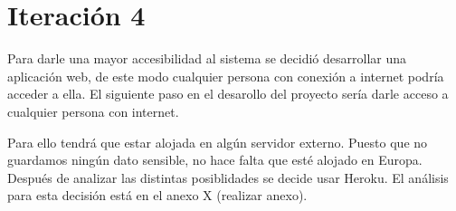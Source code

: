 \section{Iteración 4}

Para darle una mayor accesibilidad al sistema se decidió desarrollar
una aplicación web, de este modo cualquier persona con conexión a
internet podría acceder a ella. El siguiente paso en el desarollo
del proyecto sería darle acceso a cualquier persona con internet.

Para ello tendrá que estar alojada en algún servidor externo.
Puesto que no guardamos ningún dato sensible, no hace falta
que esté alojado en Europa. Después de analizar las distintas posiblidades
se decide usar Heroku. El análisis para esta decisión está en el anexo X (realizar anexo).
